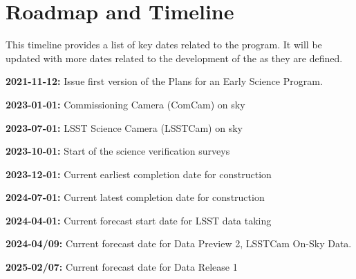 \section{Roadmap and Timeline} \label{sec:timeline}

This timeline provides a list of key dates  related to the \es program. 
It will be updated with more dates related to the development of the \esp as they are defined. 

\textbf{2021-11-12:} Issue first version of the \ro Plans for an Early Science Program. 

\textbf{2023-01-01:} Commissioning Camera (ComCam) on sky

\textbf{2023-07-01:} LSST Science Camera (LSSTCam) on sky

\textbf{2023-10-01:} Start of the science verification surveys

\textbf{2023-12-01:} Current earliest completion date for construction

\textbf{2024-07-01:} Current latest completion date for construction

\textbf{2024-04-01:} Current forecast start date for LSST data taking

\textbf{2024-04/09:} Current forecast date for Data Preview 2, LSSTCam On-Sky Data.

\textbf{2025-02/07:} Current forecast date for Data Release 1